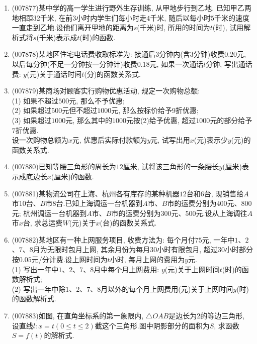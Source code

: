 \documentclass[10pt,a4paper]{article}
\begin{document}
\begin{enumerate}[1.]
\item {\tiny (007877)}某中学的高一学生进行野外生存训练, 从甲地步行到乙地. 已知甲乙两地相距$32$千米, 在前$3$小时内学生们每小时走$4$千米, 随后以每小时$5$千米的速度一直走到乙地.设他们离开甲地的距离为$s$(千米)时, 所用的时间为$t$(时), 试用解析式将$s$(千米)表示成$t$(时)的函数.
\item {\tiny (007878)}某地区住宅电话费收取标准为: 接通后$3$分钟内(含$3$分钟)收费$0.20$元, 以后每分钟(不足一分钟按一分钟计)收费$0.18$元, 如果一次通话$t$分钟, 写出通话费: $y$(元)关于通话时间$t$(分)的函数关系式.
\item {\tiny (007879)}某商场对顾客实行购物优惠活动, 规定一次购物总额:\\ 
(1) 如果不超过$500$元, 那么不予优惠;\\
(2) 如果超过$500$元但不超过$1000$元, 那么按标价给予$9$折优惠;\\
(3) 如果超过$1000$元, 那么其中的$1000$元按(2)给予优惠, 超过$1000$元的部分给予$7$折优惠.\\
设一次购物总额为$x$元, 优惠后实际付款额为$y$元, 试写出用$x$(元)表示少$y$(元)的函数关系式.
\item {\tiny (007880)}已知等腰三角形的周长为$12$厘米, 试将该三角形的一条腰长$y$(厘米)表示成底边长$x$(厘米)的函数.
\item {\tiny (007881)}某物流公司在上海、杭州各有库存的某种机器$12$台和$6$台, 现销售给$A$市$10$台、$B$市$8$台.已知上海调运一台机器到$A$市、$B$市的运费分别为$400$元、$800$元; 杭州调运一台机器到$A$市、$B$市的运费分别为$300$元、$500$元.设从上海调往$A$市$x$台, 求总运费$W$(元)关于$x$(台)的函数关系式.
\item {\tiny (007882)}某地区有一种上网服务项目, 收费方法为: 每个月付$75$元, 一年中$1$、$2$、$7$、$8$月为无限时包月上网, 其余月份为每月$30$小时有限包月, 超过$30$小时部分按$0.05$元/分计费.设上网时间为$t$小时, 每月上网的费用为$y$元.\\
(1) 写出一年中$1$、$2$、$7$、$8$月中每个月上网费用: $y$(元)关于上网时间$t$(时)的函数解析式;\\
(2) 写出一年中除$1$、$2$、$7$、$8$月以外的每个月上网费用(元)关于上网时间$y$(时)的函数解析式.
\item {\tiny (007883)}如图, 在直角坐标系的第一象限内, $\triangle OAB$是边长为$2$的等边三角形, 设直线$l:x=t(0\le t\le 2)$截这个三角形.图中阴影部分的面积为$S$, 求函数$S=f(t)$的解析式.
\begin{center}
\end{center}
\end{enumerate}
\end{document}
